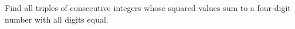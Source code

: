 Find all triples of consecutive integers whose squared values sum to a four-digit number with all digits equal.
